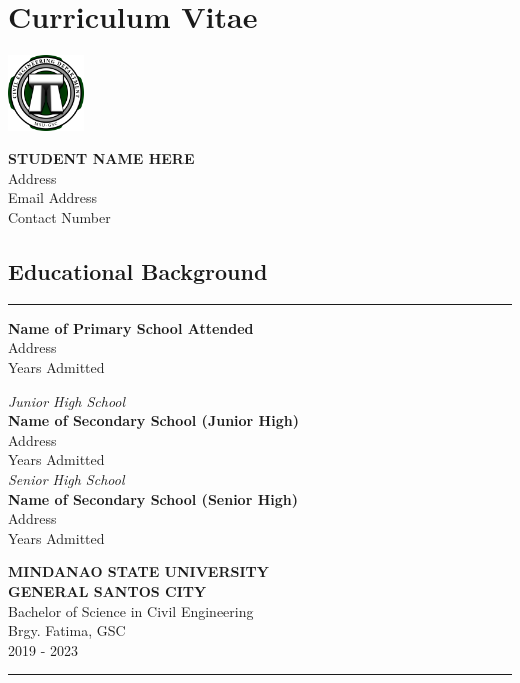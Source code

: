 \chapter{Curriculum Vitae}
\thispagestyle{backmatter}
{
\begin{center}
    \includegraphics[height=2cm]{./assets/logo.png}
\end{center}
\begin{center}
    {\Large \bfseries STUDENT NAME HERE}\\
    Address\\
    Email Address\\
    Contact Number
\end{center}
\section*{Educational Background}
\hrule
\vspace*{1em}
\begin{description}[leftmargin=!,labelwidth=4cm]
    \item[Primary]      \textbf{Name of Primary School Attended}\\
                        {\small Address\\
                        Years Admitted}
    \item[Secondary]    \textsl{Junior High School}\\
                        \textbf{Name of Secondary School (Junior High)}\\
                        {\small Address\\
                        Years Admitted}\\[1ex]
                        \textsl{Senior High School}\\
                        \textbf{Name of Secondary School (Senior High)}\\
                        {\small Address\\
                        Years Admitted}
    \item[Tertiary]     \textbf{MINDANAO STATE UNIVERSITY
                        \\GENERAL SANTOS CITY}\\
                        Bachelor of Science in Civil Engineering\\
                        {\small Brgy. Fatima, GSC\\
                        2019 - 2023}
\end{description}
\hrule
}
